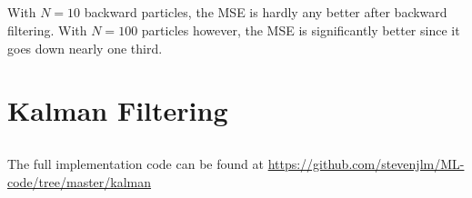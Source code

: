 \documentclass[11pt]{article}
\begin{document}
\subsection{}

With $N=10$ backward particles, the MSE is hardly any better after backward filtering. With $N=100$ particles however, the MSE is significantly better since it goes down nearly one third.

\section{Kalman Filtering}

\subsection{}

The full implementation code can be found at \url{https://github.com/stevenjlm/ML-code/tree/master/kalman}
\end{document}

